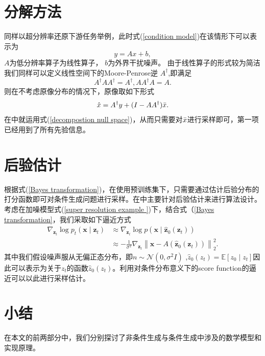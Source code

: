 \section{分解方法}
同样以超分辨率还原下游任务举例，此时式(\ref{condition model})在该情形下可以表示为
\begin{equation}
y  = A x +b,
    \label{super resolution example }
\end{equation}
$A$为低分辨率算子为线性算子， $b$为外界干扰噪声。 由于线性算子的形式较为简洁我们同样可以定义线性空间下的Moore-Penrose逆 $A^{\dagger}$,即满足 
\begin{equation}
   A^{\dagger} A A^{\dagger}= A^{\dagger} , AA^{\dagger}A = A.  
   \label{definition of moore-penrose inverse}
\end{equation}
则在不考虑原像分布的情况下，原像取如下形式
\begin{equation}
    \hat{x} = A^{\dagger} y + (I - A A^{\dagger})\Bar{x}. \label{decompostion null space}
\end{equation}
在\cite{ddnm}中就运用式(\ref{decompostion null space})，从而只需要对$\Bar{x}$进行采样即可，第一项已经用到了所有先验信息。 

\section{后验估计}
根据式(\ref{Bayes transformation})，在使用预训练集下，只需要通过估计后验分布的打分函数即可对条件生成问题进行采样。在\cite{Inverse,MCG}中主要针对后验估计来进行算法设计。 
考虑在加噪模型式(\ref{super resolution example })下，结合式（\ref{Bayes transformation}，我们采取如下逼近方式
\begin{align} \nabla_{\mathbf{z}_t} \log p_t\left(\mathbf{x} \mid \mathbf{z}_t\right) & \approx \nabla_{\mathbf{z}_t} \log p\left(\mathbf{x} \mid \hat{\mathbf{z}}_0\left(\mathbf{z}_t\right)\right) \\ & \approx-\frac{1}{\sigma^2} \nabla_{\mathbf{z}_t}\left\|\mathbf{x}-A\left(\hat{\mathbf{z}}_0\left(\mathbf{z}_t\right)\right)\right\|_2^2.\end{align}
其中我们假设噪声服从无偏正态分布，即$n\sim \mathcal{N}\left(0,\sigma^2 I\right)$ ,$\hat{z}_0(z_t) = \mathbb{E}\left[z_0\mid z_t\right]$因此可以表示为关于$z_t$的函数$\hat{z}_0(z_t)$。利用对条件分布意义下的score function的逼近可以以此进行采样估计。 

\section{小结}
在本文的前两部分中，我们分别探讨了非条件生成与条件生成中涉及的数学模型和实现原理。

